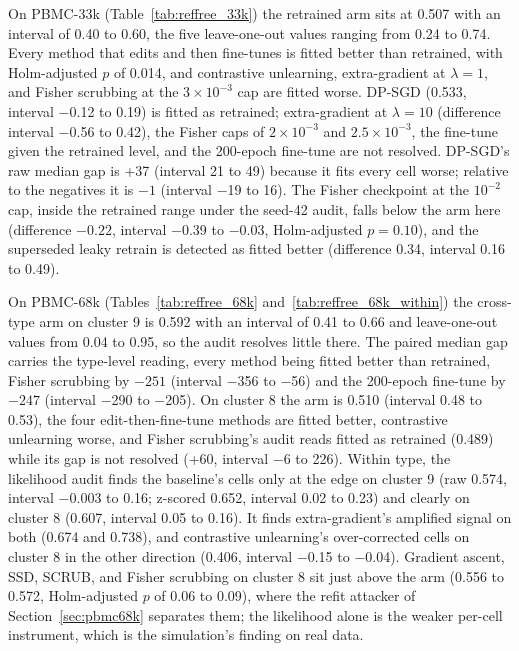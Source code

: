 \documentclass{article}
\begin{document}
On PBMC-33k (Table~\ref{tab:reffree_33k}) the retrained arm sits at 0.507 with an interval of 0.40 to 0.60, the five leave-one-out values ranging from 0.24 to 0.74. Every method that edits and then fine-tunes is fitted better than retrained, with Holm-adjusted $p$ of 0.014, and contrastive unlearning, extra-gradient at $\lambda=1$, and Fisher scrubbing at the $3\times 10^{-3}$ cap are fitted worse. DP-SGD (0.533, interval $-$0.12 to 0.19) is fitted as retrained; extra-gradient at $\lambda=10$ (difference interval $-$0.56 to 0.42), the Fisher caps of $2\times 10^{-3}$ and $2.5\times 10^{-3}$, the fine-tune given the retrained level, and the 200-epoch fine-tune are not resolved. DP-SGD's raw median gap is +37 (interval 21 to 49) because it fits every cell worse; relative to the negatives it is $-1$ (interval $-$19 to 16). The Fisher checkpoint at the $10^{-2}$ cap, inside the retrained range under the seed-42 audit, falls below the arm here (difference $-0.22$, interval $-$0.39 to $-$0.03, Holm-adjusted $p=0.10$), and the superseded leaky retrain is detected as fitted better (difference 0.34, interval 0.16 to 0.49).

On PBMC-68k (Tables~\ref{tab:reffree_68k} and~\ref{tab:reffree_68k_within}) the cross-type arm on cluster 9 is 0.592 with an interval of 0.41 to 0.66 and leave-one-out values from 0.04 to 0.95, so the audit resolves little there. The paired median gap carries the type-level reading, every method being fitted better than retrained, Fisher scrubbing by $-251$ (interval $-$356 to $-$56) and the 200-epoch fine-tune by $-247$ (interval $-$290 to $-$205). On cluster 8 the arm is 0.510 (interval 0.48 to 0.53), the four edit-then-fine-tune methods are fitted better, contrastive unlearning worse, and Fisher scrubbing's audit reads fitted as retrained (0.489) while its gap is not resolved (+60, interval $-$6 to 226). Within type, the likelihood audit finds the baseline's cells only at the edge on cluster 9 (raw 0.574, interval $-$0.003 to 0.16; z-scored 0.652, interval 0.02 to 0.23) and clearly on cluster 8 (0.607, interval 0.05 to 0.16). It finds extra-gradient's amplified signal on both (0.674 and 0.738), and contrastive unlearning's over-corrected cells on cluster 8 in the other direction (0.406, interval $-$0.15 to $-$0.04). Gradient ascent, SSD, SCRUB, and Fisher scrubbing on cluster 8 sit just above the arm (0.556 to 0.572, Holm-adjusted $p$ of 0.06 to 0.09), where the refit attacker of Section~\ref{sec:pbmc68k} separates them; the likelihood alone is the weaker per-cell instrument, which is the simulation's finding on real data.
\end{document}
